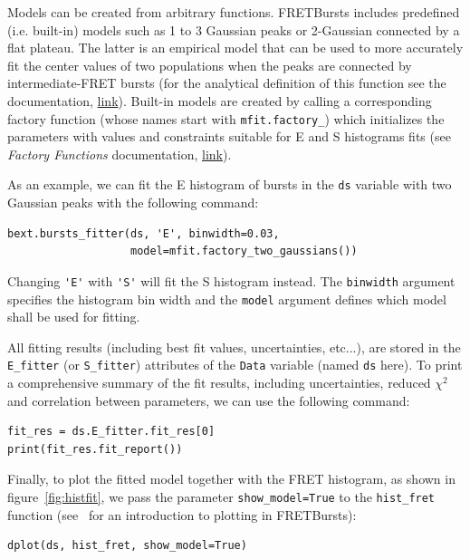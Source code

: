 \documentclass[10pt,letterpaper]{article}
\begin{document}
Models can be created from arbitrary functions. 
FRETBursts includes predefined (i.e. built-in) models 
such as 1 to 3 Gaussian peaks or 2-Gaussian connected by a flat plateau.
The latter is an empirical model that
can be used to more accurately fit the center values of two populations
when the peaks are connected by intermediate-FRET bursts
(for the analytical definition of this function see the documentation, 
\href{http://fretbursts.readthedocs.io/en/latest/mfit.html#fretbursts.mfit.factory_two_gaussians}{link}).
Built-in models are created by calling a corresponding factory function
(whose names start with \verb|mfit.factory_|) which initializes the parameters
with values and constraints suitable for E and S histograms fits
(see \textit{Factory Functions} documentation,
\href{http://fretbursts.readthedocs.org/en/latest/mfit.html#model-factory-functions}{link}).

As an example, we can fit the E histogram of bursts in the
\verb|ds| variable with two Gaussian peaks with the following command:

\begin{lstlisting}
bext.bursts_fitter(ds, 'E', binwidth=0.03,
                   model=mfit.factory_two_gaussians())
\end{lstlisting}

Changing \verb|'E'| with \verb|'S'| will fit the S histogram instead.
The \verb|binwidth| argument specifies the histogram bin width and
the \verb|model| argument defines which model shall be used for
fitting.

All fitting results (including best fit values, uncertainties, etc...),
are stored in the \verb|E_fitter| (or \verb|S_fitter|)
attributes of the \verb|Data| variable (named \verb|ds| here).
To print a comprehensive summary of the fit results, including
uncertainties, reduced $\chi^2$ and correlation between parameters,
we can use the following command:

\begin{lstlisting}
fit_res = ds.E_fitter.fit_res[0]
print(fit_res.fit_report())
\end{lstlisting}

Finally, to plot the fitted model together with the FRET histogram,
as shown in figure~\ref{fig:histfit}, we pass the parameter \verb|show_model=True|
to the \verb|hist_fret| function 
(see~ for an introduction to plotting in FRETBursts):

\begin{lstlisting}
dplot(ds, hist_fret, show_model=True)
\end{lstlisting}
\end{document}
